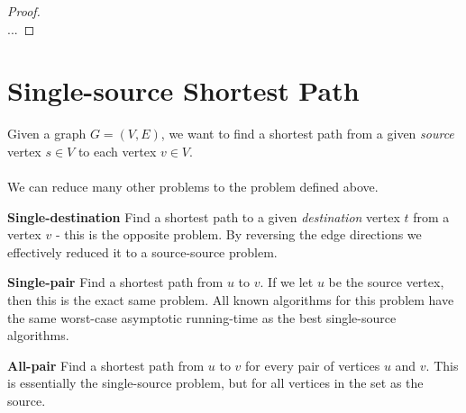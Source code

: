 \begin{proof} \textnormal{\cite[p.~645, thm.~24.1]{clrs}} \\
	...
\end{proof}

\newpage
\section{Single-source Shortest Path}
Given a graph $G = (V, E)$, we want to find a shortest path from a given
\textit{source} vertex $s \in V$ to each vertex $v \in V$.
\\\\
\noindent We can reduce many other problems to the problem defined above.
\begin{description}
	\item \textbf{Single-destination} Find a shortest path to a given
\textit{destination} vertex $t$ from a vertex $v$ - this is the opposite
problem. By reversing the edge directions we effectively reduced it to a
source-source problem.
	\item \textbf{Single-pair} Find a shortest path from $u$ to $v$. If we let
$u$ be the source vertex, then this is the exact same problem. All known
algorithms for this problem have the same worst-case asymptotic running-time
as the best single-source algorithms. %
	\item \textbf{All-pair} Find a shortest path from $u$ to $v$ for every
pair of vertices $u$ and $v$. This is essentially the single-source problem,
but for all vertices in the set as the source.
\end{description}

